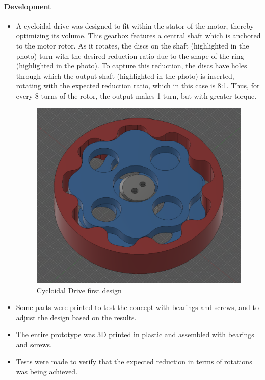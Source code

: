 \documentclass{article}
\begin{document}
\paragraph[short]{Development}
\begin{itemize}
    \item A cycloidal drive was designed to fit within the stator of the motor, thereby optimizing its volume. This gearbox features a central shaft which is anchored to the motor rotor. As it rotates, the discs on the shaft (highlighted in the photo) turn with the desired reduction ratio due to the shape of the ring (highlighted in the photo). To capture this reduction, the discs have holes through which the output shaft (highlighted in the photo) is inserted, rotating with the expected reduction ratio, which in this case is 8:1. Thus, for every 8 turns of the rotor, the output makes 1 turn, but with greater torque.
    \begin{figure}[H]
        \centering
        \includegraphics[width=\linewidth]{Images/Motor/CycProt.png}
        \caption{Cycloidal Drive first design}
    \end{figure}
    \item Some parts were printed to test the concept with bearings and screws, and to adjust the design based on the results.
    \item The entire prototype was 3D printed in plastic and assembled with bearings and screws.
    \item Tests were made to verify that the expected reduction in terms of rotations was being achieved.
\end{itemize}
\end{document}
